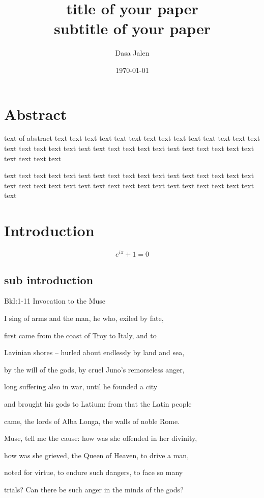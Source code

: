 \documentclass[10pt, a4paper, titlepage]{article}
\title{title of your paper\\ \small subtitle of your paper}
\author{Dasa Jalen}
\date{\today}
\begin{document}
\maketitle
\newpage

\section*{Abstract}

text of abstract text text text text text text text text text text text text text text text text text text text text text text text text text text text text text text text text text text text 

text text text text text text text text text text text text text text text text text text text text text text text text text text text text text text text text text text text

\section{Introduction}

\begin{equation}
e^{i \pi} + 1 = 0
\end{equation}

\subsection{sub introduction}

BkI:1-11 Invocation to the Muse

I sing of arms and the man, he who, exiled by fate,

first came from the coast of Troy to Italy, and to

Lavinian shores – hurled about endlessly by land and sea,

by the will of the gods, by cruel Juno’s remorseless anger,

long suffering also in war, until he founded a city

and brought his gods to Latium: from that the Latin people

came, the lords of Alba Longa, the walls of noble Rome.

Muse, tell me the cause: how was she offended in her divinity,

how was she grieved, the Queen of Heaven, to drive a man,

noted for virtue, to endure such dangers, to face so many

trials? Can there be such anger in the minds of the gods?
\end{document}
